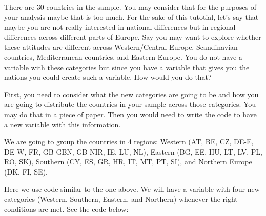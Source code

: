 \documentclass[]{book}
\newenvironment{Shaded}{\begin{snugshade}}{\end{snugshade}}
\newcommand{\NormalTok}[1]{#1}
\newcommand{\OperatorTok}[1]{\textcolor[rgb]{0.81,0.36,0.00}{\textbf{#1}}}
\newcommand{\StringTok}[1]{\textcolor[rgb]{0.31,0.60,0.02}{#1}}
\theoremstyle{definition}
\theoremstyle{definition}
\theoremstyle{definition}
\theoremstyle{remark}
\begin{document}
There are 30 countries in the sample. You may consider that for the
purposes of your analysis maybe that is too much. For the sake of this
tutotial, let's say that maybe you are not really interested in national
differences but in regional differences across different parts of
Europe. Say you may want to explore whether these attitudes are
different across Western/Central Europe, Scandinavian countries,
Mediterranean countries, and Eastern Europe. You do not have a variable
with these categories but since you have a variable that gives you the
nations you could create such a variable. How would you do that?

First, you need to consider what the new categories are going to be and
how you are going to distribute the countries in your sample across
those categories. You may do that in a piece of paper. Then you would
need to write the code to have a new variable with this information.

We are going to group the countries in 4 regions: Western (AT, BE, CZ,
DE-E, DE-W, FR, GB-GBN, GB-NIR, IE, LU, NL), Eastern (BG, EE, HU, LT,
LV, PL, RO, SK), Southern (CY, ES, GR, HR, IT, MT, PT, SI), and Northern
Europe (DK, FI, SE).

Here we use code similar to the one above. We will have a variable with
four new categories (Western, Southern, Eastern, and Northern) whenever
the right conditions are met. See the code below:

\begin{Shaded}
\end{Shaded}
\end{document}
